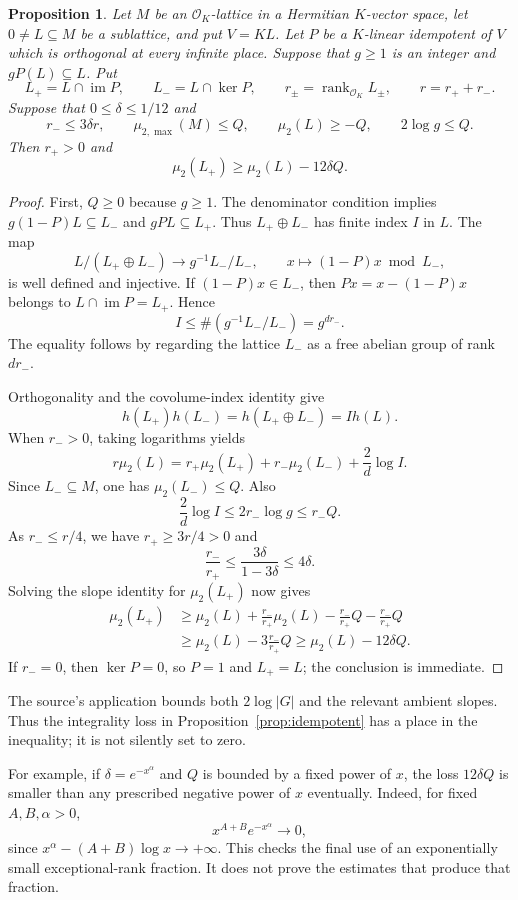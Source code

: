 \documentclass[11pt,a4paper]{article}
\newtheorem{proposition}{Proposition}[section]
\theoremstyle{remark}
\newcommand{\OO}{\mathcal O}
\DeclareMathOperator{\rank}{rank}
\DeclareMathOperator{\im}{im}
\newcommand{\src}[1]{\cite{#1}}
\begin{document}
\begin{proposition}\label{prop:slope}
Let $M$ be an $\OO_K$-lattice in a Hermitian $K$-vector space, let $0\ne L\subseteq M$ be a sublattice, and put $V=KL$. Let $P$ be a $K$-linear idempotent of $V$ which is orthogonal at every infinite place. Suppose that $g\ge1$ is an integer and $gP(L)\subseteq L$. Put
\[
 L_+=L\cap\im P,\qquad L_-=L\cap\ker P,
 \qquad r_\pm=\rank_{\OO_K}L_\pm,\qquad r=r_++r_-.
\]
Suppose that $0\le\delta\le1/12$ and
\[
 r_-\le3\delta r,\qquad
 \mu_{2,\max}(M)\le Q,\qquad
 \mu_2(L)\ge-Q,\qquad
 2\log g\le Q.
\]
Then $r_+>0$ and
\[
 \mu_2(L_+)\ge\mu_2(L)-12\delta Q.
\]
\end{proposition}
\begin{proof}
First, $Q\ge0$ because $g\ge1$. The denominator condition implies
$g(1-P)L\subseteq L_-$ and $gPL\subseteq L_+$. Thus $L_+\oplus L_-$ has finite index $I$ in $L$. The map
\[
 L/(L_+\oplus L_-)\longrightarrow g^{-1}L_-/L_-,
 \qquad x\longmapsto(1-P)x\bmod L_-,
\]
is well defined and injective. If $(1-P)x\in L_-$, then
$Px=x-(1-P)x$ belongs to $L\cap\im P=L_+$. Hence
\[
 I\le \#(g^{-1}L_-/L_-)=g^{dr_-}.
\]
The equality follows by regarding the lattice $L_-$ as a free abelian group of rank $dr_-$.

Orthogonality and the covolume-index identity give
\[
 h(L_+)h(L_-)=h(L_+\oplus L_-)=Ih(L).
\]
When $r_->0$, taking logarithms yields
\[
 r\mu_2(L)=r_+\mu_2(L_+)+r_-\mu_2(L_-)
                      +\frac2d\log I.
\]
Since $L_-\subseteq M$, one has $\mu_2(L_-)\le Q$. Also
\[
 \frac2d\log I\le2r_-\log g\le r_-Q.
\]
As $r_-\le r/4$, we have $r_+\ge3r/4>0$ and
\[
 \frac{r_-}{r_+}\le
       \frac{3\delta}{1-3\delta}\le4\delta.
\]
Solving the slope identity for $\mu_2(L_+)$ now gives
\begin{align*}
 \mu_2(L_+)
 &\ge \mu_2(L)
      +\frac{r_-}{r_+}\mu_2(L)
      -\frac{r_-}{r_+}Q-\frac{r_-}{r_+}Q\\
 &\ge \mu_2(L)-3\frac{r_-}{r_+}Q
 \ge \mu_2(L)-12\delta Q.
\end{align*}
If $r_-=0$, then $\ker P=0$, so $P=1$ and $L_+=L$; the conclusion is immediate.
\end{proof}

The source's application bounds both $2\log |G|$ and the relevant ambient slopes. Thus the integrality loss in Proposition~\ref{prop:idempotent} has a place in the inequality; it is not silently set to zero. \src{S-cut}

For example, if $\delta=e^{-x^\alpha}$ and $Q$ is bounded by a fixed power of $x$, the loss $12\delta Q$ is smaller than any prescribed negative power of $x$ eventually. Indeed, for fixed $A,B,\alpha>0$,
\[
 x^{A+B}e^{-x^\alpha}\longrightarrow0,
\]
since $x^\alpha-(A+B)\log x\to+\infty$. This checks the final use of an exponentially small exceptional-rank fraction. It does not prove the estimates that produce that fraction.
\end{document}
